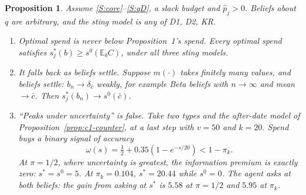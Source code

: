 \documentclass[11pt,a4paper]{article}
\newtheorem{proposition}[theorem]{Proposition}
\theoremstyle{definition}
\theoremstyle{remark}
\newcommand{\E}{\mathbb{E}}
\newcommand{\pp}{\hat p}
\begin{document}
\begin{proposition}\label{prop:c5}
Assume \ref{S:core}--\ref{S:qD}, a slack budget and $\pp_j>0$. Beliefs about $q$ are arbitrary, and the sting model is any of D1, D2, KR.
\begin{enumerate}[label=(\roman*)]
\item \emph{Optimal spend is never below Proposition~1's spend.} Every optimal spend satisfies $s_j^*(b)\ge s^0(\E_bC)$, under all three sting models.
\item \emph{It falls back as beliefs settle.} Suppose $m(\cdot)$ takes finitely many values, and beliefs settle: $b_n\to\delta_{\bar c}$ weakly, for example Beta beliefs with $n\to\infty$ and mean $\to\bar c$. Then $s_j^*(b_n)\to s^0(\bar c)$.
\item \emph{``Peaks under uncertainty'' is false.} Take two types and the after-date model of Proposition~\ref{prop:c1-counter}, at a last step with $v=50$ and $k=20$. Spend buys a binary signal of accuracy
\[
\omega(s)=\tfrac12+0.35(1-e^{-s/20})<1-\pi_k .
\]
At $\pi=1/2$, where uncertainty is greatest, the information premium is exactly zero: $s^*=s^0=5$. At $\pi_k=0.104$, $s^*=20.44$ while $s^0=0$. The agent asks at both beliefs: the gain from asking at $s^*$ is $5.58$ at $\pi=1/2$ and $5.95$ at $\pi_k$.
\end{enumerate}
\end{proposition}
\end{document}
